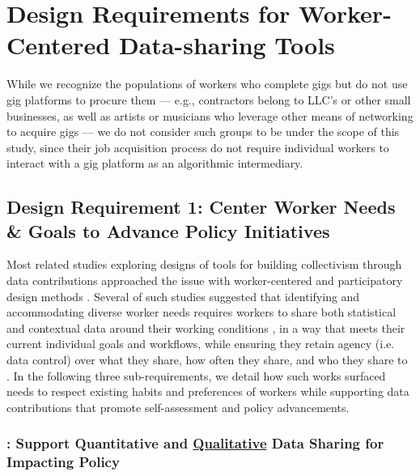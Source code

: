 \section{Design Requirements for Worker-Centered Data-sharing Tools}
\label{Related_Work_Design}
{ 
While we recognize the populations of workers who complete gigs but do not use gig platforms to procure them --- e.g., contractors belong to LLC's or other small businesses, as well as artists or musicians who leverage other means of networking to acquire gigs --- we do not consider such groups to be under the scope of this study, since their job acquisition process do not require individual workers to interact with a gig platform as an algorithmic intermediary.}

\subsection{{Design Requirement 1}: Center Worker {Needs \&} Goals {to Advance Policy Initiatives}} \label{DR1}
{Most related studies exploring designs of tools for building collectivism through data contributions approached the issue with worker-centered and participatory design methods \cite{uuapp, zhang2023stakeholder, supporting}. Several of such studies suggested that identifying and accommodating diverse worker needs requires} workers to share both statistical and contextual data around their working conditions {\cite{individualized, policy_probes}}, in a way that meets their current individual goals and workflows, while ensuring they retain agency (i.e. data control) over what they share, how often they share, and who they share to {\cite{supporting, uuapp}}. In the following three sub-requirements, we detail how {such works surfaced needs} to respect existing habits and preferences of workers while supporting data contributions that promote self-assessment and policy advancements.

\subsubsection*{: \textbf{Support Quantitative and \uline{Qualitative} Data Sharing} {for Impacting Policy}}

